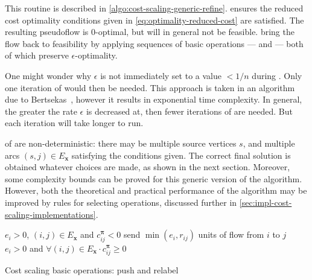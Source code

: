 This routine is described in \cref{algo:cost-scaling-generic-refine}.  ensures the reduced cost optimality conditions given in \cref{eq:optimality-reduced-cost} are satisfied. The resulting pseudoflow is $0$-optimal, but will in general not be feasible.  bring the flow back to feasibility by applying sequences of basic operations ---  and  --- both of which preserve $\epsilon$-optimality.

One might wonder why $\epsilon$ is not immediately set to a value $< 1/n$ during . Only one iteration of  would then be needed. This approach is taken in an algorithm due to Bertsekas~\cite{Bertsekas:1985}, however it results in exponential time complexity. In general, the greater the rate $\epsilon$ is decreased at, then fewer iterations of  are needed. But each iteration will take longer to run\footnotemark.

 of  are non-deterministic: there may be multiple source vertices $s$, and multiple arcs $(s,j) \in E_\mathbf{x}$ satisfying the conditions given. The correct final solution is obtained whatever choices are made, as shown in the next section. Moreover, some complexity bounds can be proved for this generic version of the algorithm. However, both the theoretical and practical performance of the algorithm may be improved by rules for selecting operations, discussed further in \cref{sec:impl-cost-scaling-implementations}.

\begin{algorithm}
\begin{algorithmic}[1]
    \Require $e_i > 0$, $(i,j) \in E_{\mathbf{x}}$ and $c^{\boldsymbol{\pi}}_{ij} < 0$
        \State send $\min\left(e_i, r_{ij}\right)$ units of flow from $i$ to $j$
    \EndFunction
    \setcounter{ALG@line}{0}
    \Statex
    \Require $e_i > 0$ and $\forall(i,j) \in E_{\mathbf{x}} \cdot c^{\boldsymbol{\pi}}_{ij} \geq 0$
    \EndFunction
\end{algorithmic}
\caption{Cost scaling basic operations: push and relabel}
\label{algo:cost-scaling-operations}
\end{algorithm}

